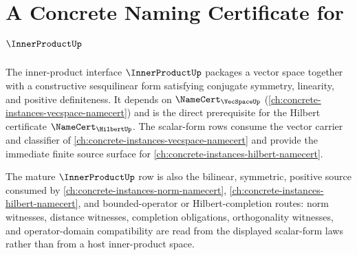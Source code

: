 \chapter{A Concrete Naming Certificate for $\InnerProductUp$}
\label{ch:concrete-instances-innerproduct-namecert}

The inner-product interface $\InnerProductUp$ packages a vector space together with a constructive sesquilinear form satisfying conjugate symmetry, linearity, and positive definiteness. It depends on $\NameCert_{\VecSpaceUp}$ (\autoref{ch:concrete-instances-vecspace-namecert}) and is the direct prerequisite for the Hilbert certificate $\NameCert_{\HilbertUp}$. The scalar-form rows consume the vector carrier and classifier of \autoref{ch:concrete-instances-vecspace-namecert} and provide the immediate finite source surface for \autoref{ch:concrete-instances-hilbert-namecert}.

The mature $\InnerProductUp$ row is also the bilinear, symmetric, positive source consumed by \autoref{ch:concrete-instances-norm-namecert}, \autoref{ch:concrete-instances-hilbert-namecert}, and bounded-operator or Hilbert-completion routes: norm witnesses, distance witnesses, completion obligations, orthogonality witnesses, and operator-domain compatibility are read from the displayed scalar-form laws rather than from a host inner-product space.













